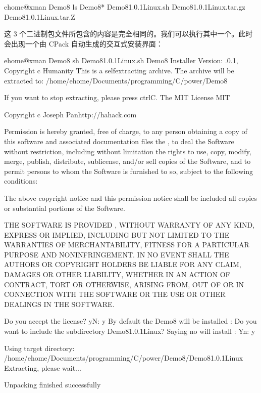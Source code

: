 \documentclass[a4paper,12pt,english]{sphinxmanual}
\begin{document}
\begin{sphinxVerbatim}[commandchars=\\\{\}]
\PYG{o}{[}ehome@xman Demo8\PYG{o}{]}\PYGZdl{} ls Demo8\PYGZhy{}*
Demo8\PYGZhy{}1.0.1\PYGZhy{}Linux.sh  Demo8\PYGZhy{}1.0.1\PYGZhy{}Linux.tar.gz  Demo8\PYGZhy{}1.0.1\PYGZhy{}Linux.tar.Z
\end{sphinxVerbatim}

\sphinxAtStartPar
这 3 个二进制包文件所包含的内容是完全相同的。我们可以执行其中一个。此时会出现一个由 CPack 自动生成的交互式安装界面：

\begin{sphinxVerbatim}[commandchars=\\\{\}]
\PYG{o}{[}ehome@xman Demo8\PYG{o}{]}\PYGZdl{} sh Demo8\PYGZhy{}1.0.1\PYGZhy{}Linux.sh
Demo8 Installer Version: .0.1, Copyright c Humanity
This is a self\PYGZhy{}extracting archive.
The archive will be extracted to: /home/ehome/Documents/programming/C/power/Demo8

If you want to stop extracting, please press \PYGZlt{}ctrl\PYGZhy{}C\PYGZgt{}.
The MIT License MIT

Copyright c  Joseph Panhttp://hahack.com

Permission is hereby granted, free of charge, to any person obtaining a copy of
this software and associated documentation files the , to deal 
the Software without restriction, including without limitation the rights to
use, copy, modify, merge, publish, distribute, sublicense, and/or sell copies of
the Software, and to permit persons to whom the Software is furnished to  so,
subject to the following conditions:

The above copyright notice and this permission notice shall be included  all
copies or substantial portions of the Software.

THE SOFTWARE IS PROVIDED , WITHOUT WARRANTY OF ANY KIND, EXPRESS OR
IMPLIED, INCLUDING BUT NOT LIMITED TO THE WARRANTIES OF MERCHANTABILITY, FITNESS
FOR A PARTICULAR PURPOSE AND NONINFRINGEMENT. IN NO EVENT SHALL THE AUTHORS OR
COPYRIGHT HOLDERS BE LIABLE FOR ANY CLAIM, DAMAGES OR OTHER LIABILITY, WHETHER
IN AN ACTION OF CONTRACT, TORT OR OTHERWISE, ARISING FROM, OUT OF OR IN
CONNECTION WITH THE SOFTWARE OR THE USE OR OTHER DEALINGS IN THE SOFTWARE.


Do you accept the license? \PYG{o}{[}yN\PYG{o}{]}:
y
By default the Demo8 will be installed :
Do you want to include the subdirectory Demo8\PYGZhy{}1.0.1\PYGZhy{}Linux?
Saying no will install :  \PYG{o}{[}Yn\PYG{o}{]}:
y

Using target directory: /home/ehome/Documents/programming/C/power/Demo8/Demo8\PYGZhy{}1.0.1\PYGZhy{}Linux
Extracting, please wait...

Unpacking finished successfully
\end{sphinxVerbatim}
\end{document}
